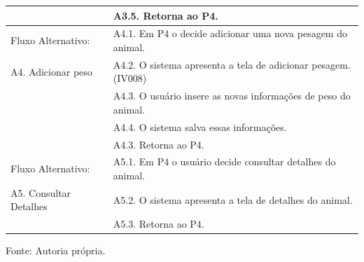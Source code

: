 \begin{apendicesenv}
\begin{table}[!h]
\begin{center}
\begin{tabular}{ | l |  p{10cm} |}
						   & A3.5. Retorna ao P4. \\ \hline
			Fluxo Alternativo:         & A4.1. Em P4 o decide adicionar uma nova pesagem do animal. \\
			A4. Adicionar peso         & A4.2. O sistema apresenta a tela de adicionar pesagem. (IV008) \\
						   & A4.3. O usuário insere as novas informações de peso do animal. \\
						   & A4.4. O sistema salva essas informações. \\
						   & A4.3. Retorna ao P4. \\ \hline
			Fluxo Alternativo:         & A5.1. Em P4 o usuário decide consultar detalhes do animal. \\
			A5. Consultar Detalhes     & A5.2. O sistema apresenta a tela de detalhes do animal. \\
						   & A5.3. Retorna ao P4. \\
			\hline
		\end{tabular}
		Fonte: Autoria própria.
	\end{center}
\end{table}

\newpage


\end{apendicesenv}
